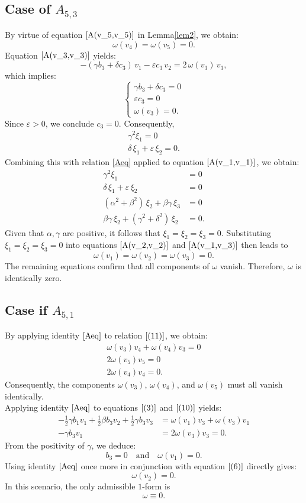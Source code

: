 \documentclass[10pt]{article}
\begin{document}
\subsection{Case of $A_{5,3}$}
By virtue of equation \(\eqref{A(v_5,v_5)}\) in Lemma\ref{lem2}, we obtain:
\[
\omega(v_4) = \omega(v_5) = 0.
\]
Equation \(\eqref{A(v_3,v_3)}\) yields:
\[
-(\gamma b_3 + \delta c_3)\,v_1 - \varepsilon c_3\,v_2 = 2\,\omega(v_3)\,v_3,
\]
which implies:
\[
\begin{cases}
\gamma b_3 + \delta c_3 = 0\\
\varepsilon c_3 = 0\\
\omega(v_3) = 0.
\end{cases}
\]
Since \(\varepsilon > 0\), we conclude \(c_3 = 0\). Consequently,
\[
\begin{aligned}
\gamma^2\xi_1=0\\
    \delta\,\xi_1 + \varepsilon\,\xi_2 = 0.
\end{aligned}
\]
Combining this with relation \eqref{Aeq} applied to equation \(\eqref{A(v_1,v_1)}\), we obtain:
\begin{align*}
\gamma^2\xi_1&=0\\
\delta\,\xi_1 + \varepsilon\,\xi_2 &= 0\\
(\alpha^2+\beta^2)\,\xi_2 + \beta\gamma\,\xi_3 &= 0\\
 \beta\gamma\,\xi_2+(\gamma^2+\delta^2)\,\xi_2 &= 0.
\end{align*}
Given that \(\alpha, \gamma\) are positive, it follows that \(\xi_1 = \xi_2 = \xi_3 = 0\). Substituting \(\xi_1 = \xi_2 = \xi_3 = 0\) into equations \(\eqref{A(v_2,v_2)}\) and \(\eqref{A(v_1,v_3)}\) then leads to
\[
\omega(v_1) = \omega(v_2) = \omega(v_3) = 0.
\]
The remaining equations confirm that all components of \(\omega\) vanish. Therefore, \(\omega\) is identically zero.


 \subsection{Case if $A_{5,1}$}
By applying identity \(\eqref{Aeq}\) to relation \(\eqref{(11)}\), we obtain:
\begin{align*} \omega(v_3)v_4 + \omega(v_4)v_3=0\\ 2\omega(v_5)v_5=0\\ 2\omega(v_4)v_4=0. \end{align*}
Consequently, the components \(\omega(v_3)\), \(\omega(v_4)\), and \(\omega(v_5)\) must all vanish identically.\\
Applying identity \(\eqref{Aeq}\) to equations \(\eqref{(3)}\) and \(\eqref{(10)}\) yields:
\begin{align*} -\frac{1}{2}\gamma b_1 v_1 + \frac{1}{2}\beta b_3v_2 + \frac{1}{2}\gamma b_3v_3 &= \omega(v_1)v_3 + \omega(v_3)v_1\\ -\gamma b_3v_1 &= 2\omega(v_3)v_3=0. \end{align*}
From the positivity of \(\gamma\), we deduce:
\[
b_3 = 0
\quad\text{and}\quad
\omega(v_1) = 0.
\]
Using identity \(\eqref{Aeq}\) once more in conjunction with equation \(\eqref{(6)}\) directly gives:
\[
\omega(v_2) = 0.
\]
In this scenario, the only admissible \(1\)-form is
\[
\omega \equiv 0.
\]
\end{document}
